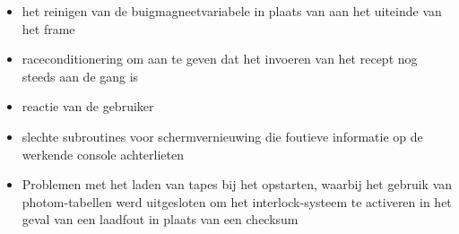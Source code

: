 \documentclass{article}
\begin{document}
	
	\begin{itemize}
		\item  het reinigen van de buigmagneetvariabele in plaats van aan het uiteinde van het frame
		\item  raceconditionering om aan te geven dat het invoeren van het recept nog steeds aan de gang is
		\item  reactie van de gebruiker
		\item  slechte subroutines voor schermvernieuwing die foutieve informatie op de werkende console achterlieten
		\item  Problemen met het laden van tapes bij het opstarten, waarbij het gebruik van photom-tabellen werd uitgesloten om het interlock-systeem te activeren in het geval van een laadfout in plaats van een checksum
	\end{itemize}
	
\end{document}
